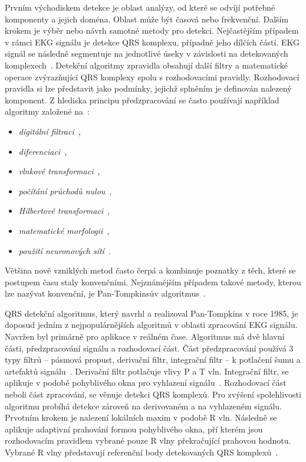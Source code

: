 Prvním východiskem detekce je oblast analýzy, od které se odvíjí potřebné
komponenty a jejich doména. Oblast může být časová nebo frekvenční. Dalším
krokem je výběr nebo návrh samotné metody pro detekci. Nejčastějším případem v
rámci EKG signálu je detekce QRS komplexu, případně jeho dílčích částí. EKG
signál se následně segmentuje na jednotlivé úseky v závislosti na detekovaných
komplexech~\cite{Canento2012}. Detekční algoritmy zpravidla obsahují další
filtry a matematické operace zvýrazňující QRS komplexy spolu s rozhodovacími
pravidly. Rozhodovací pravidla si lze představit jako podmínky, jejichž splněním
je definován nalezený komponent. Z hlediska principu předzpracování se často
používají například algoritmy založené na~\cite{Kohler2002,Vaneghi2012}:
\begin{itemize}[noitemsep]
	\item \textit{digitální filtraci}~\cite{Sornmo1982,Kesel1997481},
	\item \textit{diferenciaci}~\cite{Tompkins1983,Hamilton1987},
	\item \textit{vlnkové transformaci}~\cite{Yao2020,Ndiaye2020},
	\item \textit{počítání průchodů nulou}~\cite{Kohler2003,Turnip2018},
	\item \textit{Hilbertově transformaci}~\cite{Valluraiah2015, Ouali2020},
	\item \textit{matematické morfologii}~\cite{Li1999,Tadejko2007},
	\item \textit{použití neuronových sítí}~\cite{Kiranyaz2016,Zhai2018}.
\end{itemize}

Většina nově vzniklých metod často čerpá a kombinuje poznatky z těch, které se
postupem času staly konvenčními. Nejznámějším případem takové metody, kterou lze
nazývat konvenční, je Pan-Tompkinsův algoritmus~\cite{Pan1985}.

QRS detekční algoritmus, který navrhl a realizoval Pan-Tompkins v roce 1985, je
doposud jedním z nejpopulárnějších algoritmů v oblasti zpracování EKG signálu.
Navržen byl primárně pro aplikace v reálném čase. Algoritmus má dvě hlavní
části, předzpracování signálu a rozhodovací část. Část předzpracování používá 3
typy filtrů -- pásmová propust, derivační filtr, integrační filtr -- k potlačení
šumu a artefaktů signálu~\cite{Alvarez2013}. Derivační filtr potlačuje vlivy P a
T vln. Integrační filtr, se aplikuje v podobě pohyblivého okna pro vyhlazení
signálu~\cite{Pan1985}. Rozhodovací část neboli část zpracování, se věnuje
detekci QRS komplexů. Pro zvýšení spolehlivosti algoritmu probíhá detekce
zároveň na derivovaném a na vyhlazeném signálu. Prvotním krokem je nalezení
lokálních maxim v podobě R vln. Následně se aplikuje adaptivní prahování formou
pohyblivého okna, pří kterém jsou rozhodovacím pravidlem vybrané pouze R vlny
překračující prahovou hodnotu. Vybrané R vlny představují referenční body
detekovaných QRS komplexů~\cite{Pan1985,Alvarez2013}.

